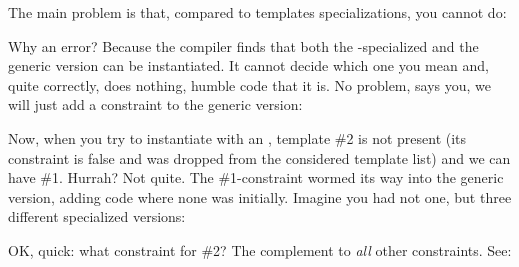 The main problem is that, compared to templates specializations, you cannot do:


Why an error? Because the compiler finds that both the -specialized and the generic version can be instantiated. It cannot decide which one you mean and, quite correctly, does nothing, humble code that it is. No problem, says you, we will just add a constraint to the generic version:


Now, when you try to instantiate with an , template \#2 is not present (its constraint is false and was dropped from the considered template list) and we can have \#1. Hurrah? Not quite. The \#1-constraint wormed its way into the generic version, adding code where none was initially. Imagine you had not one, but three different specialized versions:


OK, quick: what constraint for \#2? The complement to \emph{all} other constraints. See:


